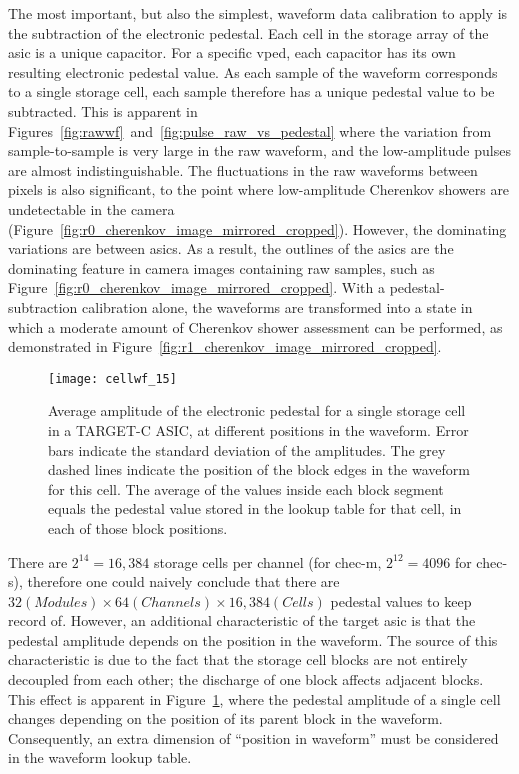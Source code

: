 The most important, but also the simplest, waveform data calibration to apply is the subtraction of the electronic pedestal. Each cell in the storage array of the \gls{asic} is a unique capacitor. For a specific \gls{vped}, each capacitor has its own resulting electronic pedestal value. As each sample of the waveform corresponds to a single storage cell, each sample therefore has a unique pedestal value to be subtracted. This is apparent in Figures~\ref{fig:rawwf}~and~\ref{fig:pulse_raw_vs_pedestal} where the variation from sample-to-sample is very large in the raw waveform, and the low-amplitude pulses are almost indistinguishable. The fluctuations in the raw waveforms between pixels is also significant, to the point where low-amplitude Cherenkov showers are undetectable in the camera (Figure~\ref{fig:r0_cherenkov_image_mirrored_cropped}). However, the dominating variations are between \glspl{asic}. As a result, the outlines of the \glspl{asic} are the dominating feature in camera images containing raw samples, such as Figure~\ref{fig:r0_cherenkov_image_mirrored_cropped}. With a pedestal-subtraction calibration alone, the waveforms are transformed into a state in which a moderate amount of Cherenkov shower assessment can be performed, as demonstrated in Figure~\ref{fig:r1_cherenkov_image_mirrored_cropped}.

\begin{figure}
	\centering
    \texttt{[image: cellwf\_15]} 
	\caption[Storage-cell-amplitude dependence on position in the waveform.]{Average amplitude of the electronic pedestal for a single storage cell in a TARGET-C ASIC, at different positions in the waveform. Error bars indicate the standard deviation of the amplitudes. The grey dashed lines indicate the position of the block edges in the waveform for this cell. The average of the values inside each block segment equals the pedestal value stored in the lookup table for that cell, in each of those block positions.} 
	\label{fig:cellwf}
\end{figure}

There are $2^{14} = 16,384$ storage cells per channel (for \gls{chec-m}, $2^{12} = 4096$ for \gls{chec-s}), therefore one could naively conclude that there are $32 (Modules) \times 64 (Channels) \times 16,384 (Cells)$ pedestal values to keep record of. However, an additional characteristic of the \gls{target} \gls{asic} is that the pedestal amplitude depends on the position in the waveform. The source of this characteristic is due to the fact that the storage cell blocks are not entirely decoupled from each other; the discharge of one block affects adjacent blocks. This effect is apparent in Figure~\ref{fig:cellwf}, where the pedestal amplitude of a single cell changes depending on the position of its parent block in the waveform. Consequently, an extra dimension of ``position in waveform'' must be considered in the waveform lookup table.

